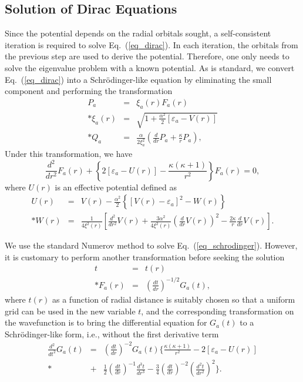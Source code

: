 \documentclass[preprint, floatfix, pra, showpacs, showkeys]{revtex4}
\begin{document}
\subsection{Solution of Dirac Equations}
Since the potential depends on the radial orbitals sought, a self-consistent
iteration is required to solve Eq.~(\ref{eq_dirac}). In each iteration,
the orbitals from the previous step are used to derive the
potential. Therefore, one only needs to solve the eigenvalue problem with a
known potential. As is 
standard, we convert Eq.~(\ref{eq_dirac}) into a Schr\"{o}dinger-like
equation by 
eliminating the small component and performing the transformation
\cite{chernysheva99} 
\begin{eqnarray}
\label{eq_transform}
P_a &=& \xi_a(r) F_a(r) \nonumber \\*
\xi_a(r) &=& \sqrt{1+\frac{\alpha^2}{2}\left[\varepsilon_a-V(r)\right]} 
\nonumber \\*
Q_a &=& \frac{\alpha}{2\xi_a^2}\left(\frac{d}{d r}P_a + 
\frac{\kappa}{r}P_a\right),
\end{eqnarray}
Under this transformation, we have
\begin{equation}
\label{eq_schrodinger}
\frac{d^2}{d r^2}F_a(r) + \left\{2\left[\varepsilon_a-U(r)\right] - 
\frac{\kappa(\kappa + 1)}{r^2}\right\}F_a(r) = 0,
\end{equation}
where $U(r)$ is an effective potential defined as
\begin{eqnarray} 
\label{eq_UW}
U(r) &=& V(r) - \frac{\alpha^2}{2}\left\{\left[V(r) - \varepsilon_a\right]^2 
-W(r)\right\} \nonumber \\*
W(r) &=& \frac{1}{4\xi^2(r)}\left[\frac{d^2}{d r^2}V(r) +
\frac{3\alpha^2}{4\xi^2(r)}\left(\frac{d}{d r}V(r)\right)^2 - 
\frac{2\kappa}{r}\frac{d}{d r}V(r)\right].
\end{eqnarray}

We use the standard Numerov method to solve Eq.~(\ref{eq_schrodinger}). 
However, it is customary to perform another transformation before seeking the
solution
\begin{eqnarray}
t &=& t(r) \nonumber\\*
F_a(r) &=& \left(\frac{d t}{d r}\right)^{-1/2} G_a(t),
\end{eqnarray}
where $t(r)$ as a function of radial distance is suitably chosen
so that a uniform grid can be used in the new variable $t$, and the
corresponding transformation on the wavefunction is to bring the differential
equation for $G_a(t)$ to a Schr\"{o}dinger-like form, i.e., without the first
derivative term
\begin{eqnarray}
\label{eq_Ga}
\frac{d^2}{d t^2}G_a(t) &=& \left(\frac{d t}{d r}\right)^{-2}G_a(t)
\Bigg\{\frac{\kappa(\kappa +1)}{r^2} - 2\left[\varepsilon_a-U(r)\right]
\nonumber\\*
&+&\frac{1}{2}\left(\frac{d t}{d r}\right)^{-1}\frac{d^3 t}{d r^3}
-\frac{3}{4}\left(\frac{d t}{d r}\right)^{-2}\left(\frac{d^2 t}{d
r^2}\right)^2\Bigg\}.
\end{eqnarray}
\end{document}
